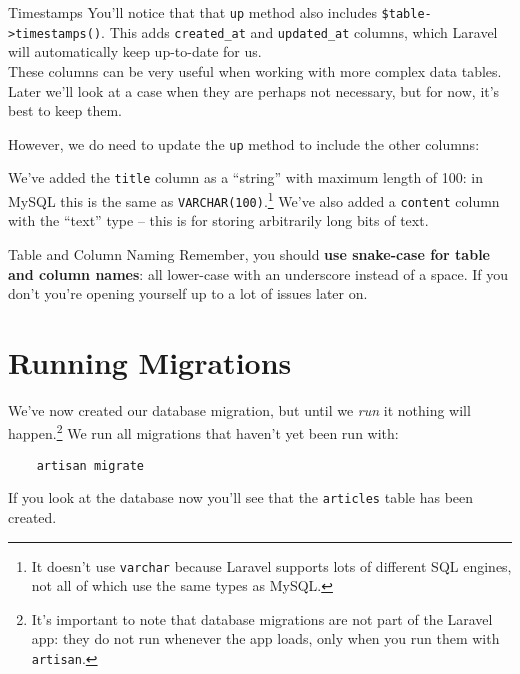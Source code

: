 \pagebreak

\begin{infobox}{Timestamps}
    You'll notice that that \texttt{up} method also includes \texttt{\$table->timestamps()}. This adds \texttt{created\_at} and \texttt{updated\_at} columns, which Laravel will automatically keep up-to-date for us.
    \\

    These columns can be very useful when working with more complex data tables. Later we'll look at a case when they are perhaps not necessary, but for now, it's best to keep them.
\end{infobox}

However, we do need to update the \texttt{up} method to include the other columns:


We've added the \texttt{title} column as a ``string'' with maximum length of 100: in MySQL this is the same as \texttt{VARCHAR(100)}.\footnote{It doesn't use \texttt{varchar} because Laravel supports lots of different SQL engines, not all of which use the same types as MySQL.} We've also added a \texttt{content} column with the ``text'' type – this is for storing arbitrarily long bits of text.

\begin{infobox}{Table and Column Naming}
    Remember, you should \textbf{use snake-case for table and column names}: all lower-case with an underscore instead of a space. If you don't you're opening yourself up to a lot of issues later on.
\end{infobox}


\section{Running Migrations}

We've now created our database migration, but until we \textit{run} it nothing will happen.\footnote{It's important to note that database migrations are not part of the Laravel app: they do not run whenever the app loads, only when you run them with \texttt{artisan}.} We run all migrations that haven't yet been run with:

\begin{verbatim}
    artisan migrate
\end{verbatim}

If you look at the database now you'll see that the \texttt{articles} table has been created.
\\


